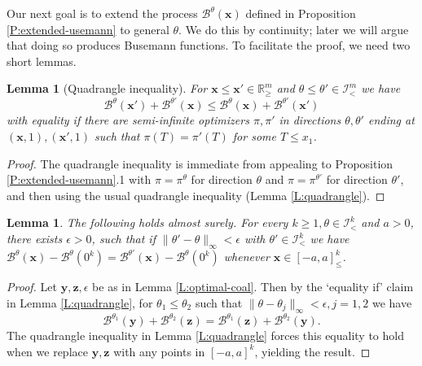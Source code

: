 \documentclass[11pt]{article}
\newcommand{\ep}{\epsilon}
\newcommand{\cB}{\mathcal{B}}
\newcommand{\cI}{\mathcal{I}}
\newcommand{\bx}{\mathbf{x}}
\newcommand{\by}{\mathbf{y}}
\newcommand{\bz}{\mathbf{z}}
\newtheorem{lemma}[theorem]{Lemma}
\theoremstyle{definition} %
\theoremstyle{remark} %
\begin{document}
Our next goal is to extend the process $\cB^\theta(\bx)$ defined in Proposition \ref{P:extended-usemann} to general $\theta$. We do this by continuity; later we will argue that doing so produces Busemann functions. To facilitate the proof, we need two short lemmas.

\begin{lemma}[Quadrangle inequality]
	\label{L:quadrangle-busemann}
	For $\bx\le \bx'\in \mathbb R^m_\ge$ and $\theta\le \theta'\in \cI^m_<$ we have
	$$
	\cB^{\theta}(\bx')+\cB^{\theta'}(\bx)\le 	\cB^{\theta}(\bx)+\cB^{\theta'}(\bx')
	$$
	with equality if there are semi-infinite optimizers $\pi, \pi'$ in directions $\theta, \theta'$ ending at $(\bx, 1), (\bx', 1)$ such that $\pi(T) = \pi'(T)$ for some $T \le x_1$.
	\end{lemma}
\begin{proof}
The quadrangle inequality is immediate from appealing to Proposition \ref{P:extended-usemann}.1 with $\pi = \pi^\theta$ for direction $\theta$ and $\pi = \pi^{\theta'}$ for direction $\theta'$, and then using the usual quadrangle inequality (Lemma \ref{L:quadrangle}). 
\end{proof}

\begin{lemma}
	\label{L:Blx-continuity}
	The following holds almost surely. For every $k \ge 1, \theta \in \cI^k_<$ and $a > 0$, there exists $\ep > 0$, such that if $\|\theta' - \theta\|_\infty < \ep$ with $\theta' \in \cI^k_<$ we have $\cB^\theta(\bx) - \cB^\theta(0^k) = \cB^{\theta'}(\bx) - \cB^\theta(0^k)$ whenever $\bx \in [-a, a]^k_\le$. 
\end{lemma}

\begin{proof}
Let $\by, \bz, \ep$ be as in Lemma \ref{L:optimal-coal}. Then by the `equality if' claim in Lemma \ref{L:quadrangle}, for $\theta_1 \le \theta_2$ such that $\|\theta - \theta_j\|_\infty < \ep, j = 1, 2$ we have
$$
	\cB^{\theta_1}(\by)+\cB^{\theta_2}(\bz) = 	\cB^{\theta_1}(\bz)+\cB^{\theta_2}(\by).
$$
The quadrangle inequality in Lemma \ref{L:quadrangle} forces this equality to hold when we replace $\by, \bz$ with any points in $[-a, a]^k$, yielding the result.
\end{proof}
\end{document}
